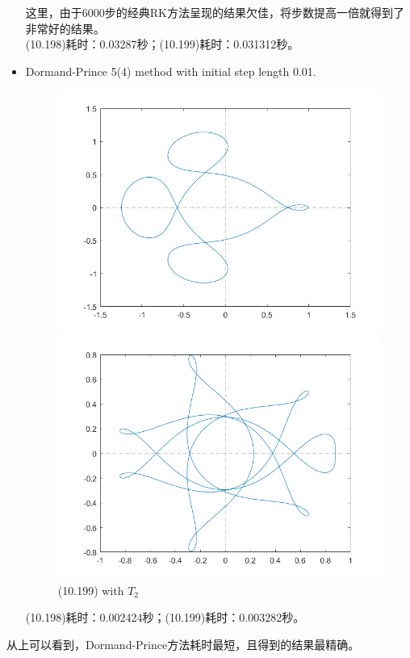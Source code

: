 \documentclass[a4paper,11.5pt,UTF8]{ctexart}
\begin{document}
\begin{large}
\begin{itemize}
\begin{figure}[H]
\begin{minipage}{0.48\textwidth}
    	    \end{minipage}
        \label{fig:2}
    \end{figure}
    这里，由于6000步的经典RK方法呈现的结果欠佳，将步数提高一倍就得到了非常好的结果。\\
    (10.198)耗时：0.03287秒；(10.199)耗时：0.031312秒。
    \item Dormand-Prince 5(4) method with initial step length 0.01.
    \begin{figure}[H]
        \centering
            \begin{minipage}{0.48\textwidth}
    	    \centering
    	    \caption{(10.198) with $T_1$}
    	    \includegraphics[scale=0.48]{./image/DP54_1.png}
    	    \end{minipage}
            \begin{minipage}{0.48\textwidth}
    	    \centering
    	    \caption{(10.199) with $T_2$}
    	    \includegraphics[scale=0.48]{./image/DP54_2.png}
    	    \end{minipage}
        \label{fig:3}
    \end{figure}
    (10.198)耗时：0.002424秒；(10.199)耗时：0.003282秒。
\end{itemize}
从上可以看到，Dormand-Prince方法耗时最短，且得到的结果最精确。

\end{large}
\end{document}
